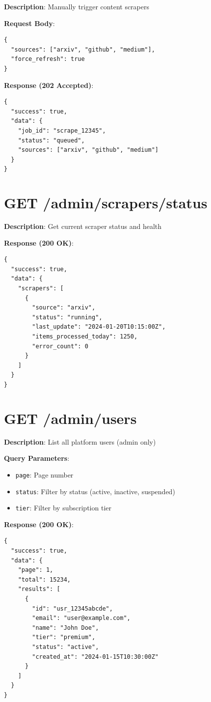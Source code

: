 \documentclass[12pt,a4paper]{report}
\begin{document}
\textbf{Description}: Manually trigger content scrapers

\textbf{Request Body}:
\begin{lstlisting}
{
  "sources": ["arxiv", "github", "medium"],
  "force_refresh": true
}
\end{lstlisting}

\textbf{Response (202 Accepted)}:
\begin{lstlisting}
{
  "success": true,
  "data": {
    "job_id": "scrape_12345",
    "status": "queued",
    "sources": ["arxiv", "github", "medium"]
  }
}
\end{lstlisting}

\section{GET /admin/scrapers/status}

\textbf{Description}: Get current scraper status and health

\textbf{Response (200 OK)}:
\begin{lstlisting}
{
  "success": true,
  "data": {
    "scrapers": [
      {
        "source": "arxiv",
        "status": "running",
        "last_update": "2024-01-20T10:15:00Z",
        "items_processed_today": 1250,
        "error_count": 0
      }
    ]
  }
}
\end{lstlisting}

\section{GET /admin/users}

\textbf{Description}: List all platform users (admin only)

\textbf{Query Parameters}:
\begin{itemize}
    \item \texttt{page}: Page number
    \item \texttt{status}: Filter by status (active, inactive, suspended)
    \item \texttt{tier}: Filter by subscription tier
\end{itemize}

\textbf{Response (200 OK)}:
\begin{lstlisting}
{
  "success": true,
  "data": {
    "page": 1,
    "total": 15234,
    "results": [
      {
        "id": "usr_12345abcde",
        "email": "user@example.com",
        "name": "John Doe",
        "tier": "premium",
        "status": "active",
        "created_at": "2024-01-15T10:30:00Z"
      }
    ]
  }
}
\end{lstlisting}
\end{document}
